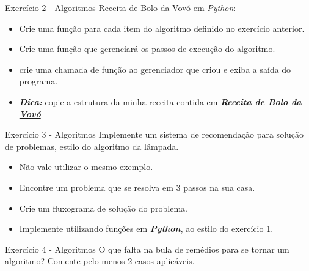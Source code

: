 \documentclass{beamer}
\begin{document}
\begin{frame}{Exercício 2 - Algoritmos}
Receita de Bolo da Vovó em \textit{Python}:
\begin{itemize}
	\item Crie uma função para cada item do algoritmo definido no exercício anterior.
	\item Crie uma função que gerenciará os passos de execução do algoritmo.
	\item crie uma chamada de função ao gerenciador que criou e exiba a saída do programa.
	\item \textbf{\textit{Dica:}} copie a estrutura da minha receita contida em \href{Exercicios/Modulo_01/exercicio_01/receita_de_bolo.py}{\textbf{\textit{Receita de Bolo da Vovó}}}
\end{itemize}
\end{frame}


\begin{frame}{Exercício 3 - Algoritmos}
	Implemente um sistema de recomendação para solução de problemas, estilo do algoritmo da lâmpada.
	\begin{itemize}
		\item Não vale utilizar o mesmo exemplo.
		\item Encontre um problema que se resolva em 3 passos na sua casa.
		\item Crie um fluxograma de solução do problema.
		\item Implemente utilizando funções em \textbf{\textit{Python}}, ao estilo do exercício 1.
	\end{itemize}
\end{frame}


\begin{frame}{Exercício 4 - Algoritmos}
	 O que falta na bula de remédios para se tornar um algoritmo? Comente pelo menos 2 casos aplicáveis.
	 
\end{frame}




\backmatter
\end{document}
